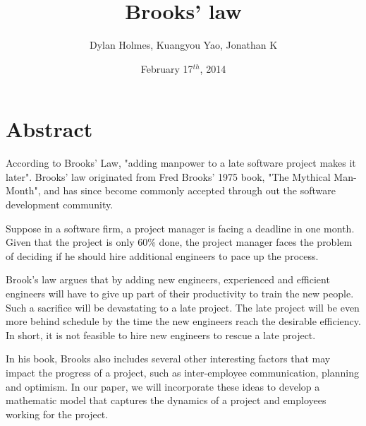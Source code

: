 \documentclass{article}
\author{Dylan Holmes, Kuangyou Yao, Jonathan K}
\title{Brooks' law}
\date{February 17$^{th}$, 2014}
\begin{document}
\maketitle

\section*{Abstract}
According to Brooks' Law, "adding manpower to a late software project makes it
later". Brooks' law originated from Fred Brooks' 1975 book, "The Mythical
Man-Month", and has since become commonly accepted through out the software
development community. 

Suppose in a software firm, a project manager is facing a deadline in one month.
Given that the project is only 60\% done, the project manager faces the problem
of deciding if he should hire additional engineers to pace up the process.

Brook’s law argues that by adding new engineers, experienced and efficient
engineers will have to give up part of their productivity to train the new
people. Such a sacrifice will be devastating to a late project. The late project
will be even more behind schedule by the time the new engineers reach the
desirable efficiency. In short, it is not feasible to hire new engineers to
rescue a late project.

In his book, Brooks also includes several other interesting factors that may
impact the progress of a project, such as inter-employee communication, planning
and optimism. In our paper, we will incorporate these ideas to develop a
mathematic model that captures the dynamics of a project and employees working
for the project.
\end{document}
